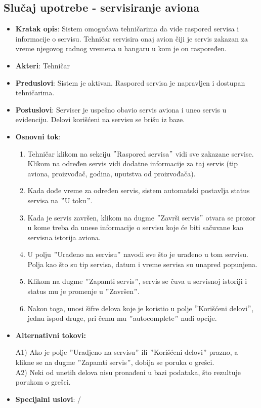 \documentclass[a4paper]{article}
\begin{document}
\subsection{Slučaj upotrebe - servisiranje aviona}
\label{subsec:servisiranje_aviona}
\begin{itemize}
    \item \textbf{Kratak opis}: Sistem omogućava tehničarima da vide raspored servisa i informacije o servisu. Tehničar servisira onaj avion čiji je servis zakazan za vreme njegovog radnog vremena u hangaru u kom je on raspoređen.
    \item \textbf{Akteri}: Tehničar
    \item \textbf{Preduslovi}: Sistem je aktivan. Raspored servisa je napravljen i dostupan tehničarima.
    \item \textbf{Postuslovi}: Serviser je uspešno obavio servis aviona i uneo servis u evidenciju. Delovi korišćeni na servisu se brišu iz baze.
    \item \textbf{Osnovni tok}:
        \begin{enumerate}
            \item Tehničar klikom na sekciju $"$Raspored servisa$"$ vidi sve zakazane servise. Klikom na određen servis vidi dodatne informacije za taj servis (tip aviona, proizvođač, godina, uputstva od proizvođača).
            \item Kada dođe vreme za određen servis, sistem automatski postavlja status servisa na $"$U toku$"$.
            \item Kada je servis završen, klikom na dugme $"$Završi servis$"$ otvara se prozor u kome treba da unese informacije o servisu koje će biti sačuvane kao servisna istorija aviona.
            \item U polju $"$Urađeno na servisu$"$ navodi sve što je urađeno u tom servisu. Polja kao što su tip servisa, datum i vreme servisa su unapred popunjena.
            \item Klikom na dugme $"$Zapamti servis$"$, servis se čuva u servisnoj istoriji i status mu je promenje u $"$Završen$"$.
            \item Nakon toga, unosi šifre delova koje je koristio u polje $"$Korišćeni delovi$"$, jednu ispod druge, pri čemu mu $"$autocomplete$"$ nudi opcije.
        \end{enumerate}
    \item \textbf{Alternativni tokovi:}
        \begin{enumerate}
            A1) Ako je polje $"$Uradjeno na servisu$"$ ili $"$Korišćeni delovi$"$ prazno, a klikne se na dugme $"$Zapamti servis$"$, dobija se poruka o grešci.\\
            A2) Neki od unetih delova nisu pronađeni u bazi podataka, što rezultuje porukom o grešci.
        \end{enumerate}
    \item \textbf{Specijalni uslovi}: /
\end{itemize}
\end{document}

